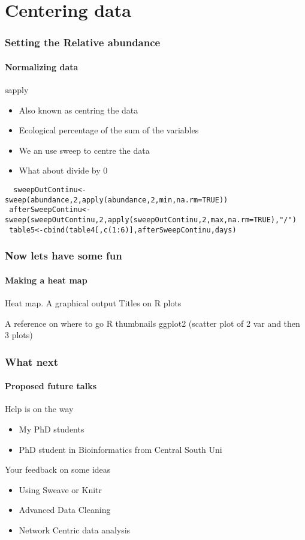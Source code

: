 \documentclass{article}\usepackage[]{graphicx}\usepackage[]{color}
\begin{document}
\section*{Centering data}
\begin{frame}[fragile]
  \frametitle{Setting the Relative abundance}
  \framesubtitle{Normalizing data}
  \begin{block}{sapply}
  \begin{itemize}
  \item Also known as centring the data
  \item Ecological percentage of the sum of the variables
  
  \item We an use sweep to centre the data
  \item What about divide by 0
  \end{itemize}
  \end{block}
  \begin{lstlisting}
  sweepOutContinu<-sweep(abundance,2,apply(abundance,2,min,na.rm=TRUE))	
 afterSweepContinu<-sweep(sweepOutContinu,2,apply(sweepOutContinu,2,max,na.rm=TRUE),"/") 
 table5<-cbind(table4[,c(1:6)],afterSweepContinu,days)
  \end{lstlisting}
\end{frame}



\begin{frame}
  \frametitle{Now lets have some fun}
  \framesubtitle{Making a heat map}
  
  Heat map.
  A graphical output
  Titles on R plots
  
  A reference on where to go
  R thumbnails 
  ggplot2 (scatter plot of 2 var and then 3 plots)
\end{frame}

\begin{frame}
  \frametitle{What next}
  \framesubtitle{Proposed future talks}
  \begin{block}{Help is on the way}
  \begin{itemize}
  \item My PhD students
  \item PhD student in Bioinformatics from Central South Uni
  \end{itemize}
  \end{block}
  \begin{block}{Your feedback on some ideas}
  \begin{itemize}
  \item Using Sweave or Knitr
  \item Advanced Data Cleaning 
  \item Network Centric data analysis
  \end{itemize}
  \end{block}
\end{frame}
\end{document}
